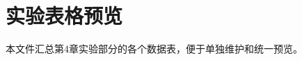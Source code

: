 \documentclass[a4paper,12pt,fontset=fandol]{ctexart}
\begin{document}
\section*{实验表格预览}

本文件汇总第4章实验部分的各个数据表，便于单独维护和统一预览。








\end{document}
